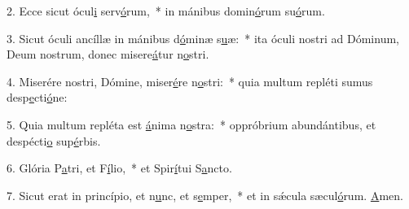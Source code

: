 2. Ecce sicut ócul\uline{i} serv\uline{ó}rum,~* in mánibus domin\uline{ó}rum su\uline{ó}rum.\par 
3. Sicut óculi ancíllæ in mánibus d\uline{ó}minæ s\uline{u}æ:~* ita óculi nostri ad Dóminum, Deum nostrum, donec misere\uline{á}tur n\uline{o}stri.\par 
4. Miserére nostri, Dómine, miser\uline{é}re n\uline{o}stri:~* quia multum repléti sumus desp\uline{e}cti\uline{ó}ne:\par 
5. Quia multum repléta est \uline{á}nima n\uline{o}stra:~* oppróbrium abundántibus, et despécti\uline{o} sup\uline{é}rbis.\par 
6. Glória P\uline{a}tri, et F\uline{í}lio,~* et Spir\uline{í}tui S\uline{a}ncto.\par 
7. Sicut erat in princípio, et n\uline{u}nc, et s\uline{e}mper,~* et in sǽcula sæcul\uline{ó}rum. \uline{A}men.\par 
